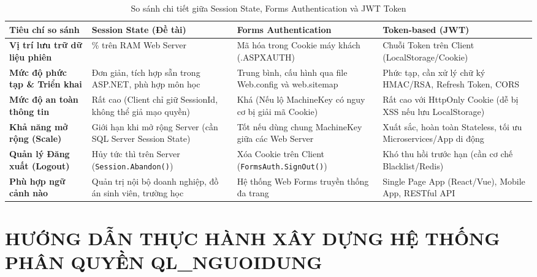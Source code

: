 \documentclass[12pt,a4paper]{report}
\begin{document}
\begin{table}[H]
\centering
\footnotesize
\setlength{\tabcolsep}{3.5pt}
\renewcommand{\arraystretch}{1.05}
\begin{tabularx}{\textwidth}{>{\raggedright\arraybackslash}p{2.6cm} >{\raggedright\arraybackslash}X >{\raggedright\arraybackslash}X >{\raggedright\arraybackslash}X}
\toprule
\textbf{Tiêu chí so sánh} & \textbf{Session State (Đề tài)} & \textbf{Forms Authentication} & \textbf{Token-based (JWT)} \\
\midrule
\textbf{Vị trí lưu trữ dữ liệu phiên} & 100\% trên RAM Web Server & Mã hóa trong Cookie máy khách (.ASPXAUTH) & Chuỗi Token trên Client (LocalStorage/Cookie) \\
\addlinespace[2pt]
\textbf{Mức độ phức tạp \& Triển khai} & Đơn giản, tích hợp sẵn trong ASP.NET, phù hợp môn học & Trung bình, cấu hình qua file Web.config và web.sitemap & Phức tạp, cần xử lý chữ ký HMAC/RSA, Refresh Token, CORS \\
\addlinespace[2pt]
\textbf{Mức độ an toàn thông tin} & Rất cao (Client chỉ giữ SessionId, không thể giả mạo quyền) & Khá (Nếu lộ MachineKey có nguy cơ bị giải mã Cookie) & Rất cao với HttpOnly Cookie (dễ bị XSS nếu lưu LocalStorage) \\
\addlinespace[2pt]
\textbf{Khả năng mở rộng (Scale)} & Giới hạn khi mở rộng Server (cần SQL Server Session State) & Tốt nếu dùng chung MachineKey giữa các Web Server & Xuất sắc, hoàn toàn Stateless, tối ưu Microservices/App di động \\
\addlinespace[2pt]
\textbf{Quản lý Đăng xuất (Logout)} & Hủy tức thì trên Server (\texttt{Session.Abandon()}) & Xóa Cookie trên Client (\texttt{FormsAuth.SignOut()}) & Khó thu hồi trước hạn (cần cơ chế Blacklist/Redis) \\
\addlinespace[2pt]
\textbf{Phù hợp ngữ cảnh nào} & Quản trị nội bộ doanh nghiệp, đồ án sinh viên, trường học & Hệ thống Web Forms truyền thống đa trang & Single Page App (React/Vue), Mobile App, RESTful API \\
\bottomrule
\end{tabularx}
\caption{So sánh chi tiết giữa Session State, Forms Authentication và JWT Token}\label{tab:ss_vs_forms_jwt}
\end{table}

\chapter{HƯỚNG DẪN THỰC HÀNH XÂY DỰNG HỆ THỐNG PHÂN QUYỀN QL\_NGUOIDUNG}
\end{document}
